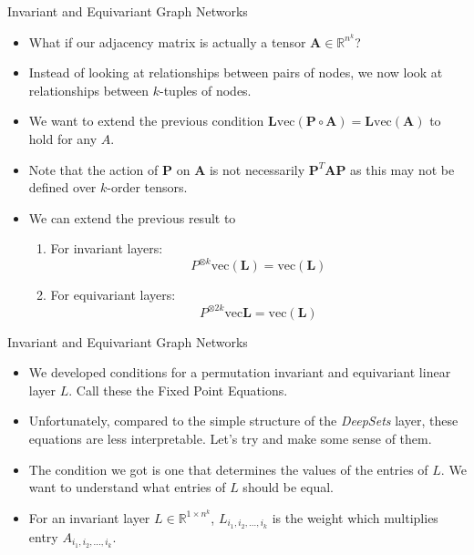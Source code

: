 \documentclass{beamer}
\begin{document}
\begin{frame}{Invariant and Equivariant Graph Networks}
    \begin{itemize}
        \setlength{\itemsep}{\fill}
        \item What if our adjacency matrix is actually a tensor $\mathbf{A} \in \mathbb{R}^{n^k}$?
        \item Instead of looking at relationships between pairs of nodes, we now look at relationships between $k$-tuples of nodes.
        \item We want to extend the previous condition \(\mathbf{L}\text{vec}(\boldsymbol{P} \circ \mathbf{A}) = \mathbf{L}\text{vec}(\mathbf{A})\) to hold for any $A$.
        \item Note that the action of $\boldsymbol{P}$ on $\mathbf{A}$ is not necessarily $\boldsymbol{P}^T \mathbf{A} \boldsymbol{P}$ as this may not be defined over $k$-order tensors. 
        \item We can extend the previous result to
        \begin{enumerate}
            \item For invariant layers: \[ P^{\otimes k}\text{vec}(\mathbf{L}) = \text{vec}(\mathbf{L}) \]
            \item For equivariant layers: \[ P^{\otimes 2k}\text{vec}\mathbf{L} = \text{vec}(\mathbf{L}) \]
        \end{enumerate}
    \end{itemize}
\end{frame}
\begin{frame}{Invariant and Equivariant Graph Networks}
    \begin{itemize}
        \setlength{\itemsep}{\fill}
        \item We developed conditions for a permutation invariant and equivariant linear layer $L$. Call these the Fixed Point Equations.
        \item Unfortunately, compared to the simple structure of the \emph{DeepSets} layer, these equations are less interpretable. Let's try and make some sense of them.
        \item The condition we got is one that determines the values of the entries of $L$. We want to understand what entries of $L$ should be equal.
        \item For an invariant layer $L \in \mathbb{R}^{1 \times n^k}$, $L_{i_1,i_2,\ldots,i_k}$ is the weight which multiplies entry $A_{i_1,i_2,\ldots,i_k}$.
    \end{itemize}
\end{frame}
\end{document}
